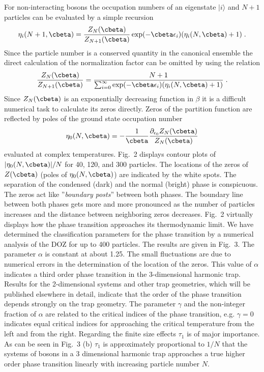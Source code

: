 For non-interacting bosons the occupation numbers
of an eigenstate $|i\rangle$  and $N+1$ particles
can be evaluated by a simple recursion \cite{bose1}
\begin{equation} \label{recocc}
\eta_i(N+1,\cbeta) = \frac{Z_N(\cbeta)}{Z_{N+1}(\cbeta)} 
\exp(-\cbeta \epsilon_i) (\eta_i(N,\cbeta)+1) \; .
\end{equation}
Since the particle number is a conserved quantity in the canonical
ensemble the direct calculation of the normalization factor 
can be omitted by using the relation
\begin{equation} \label{norm}
\frac{Z_N(\cbeta)}{Z_{N+1}(\cbeta)} = 
\frac{N+1}{\sum_{i=0}^{\infty} \exp(-\cbeta \epsilon_i)
(\eta_i(N,\cbeta)+1)} \;.
\end{equation}
Since $Z_N(\cbeta)$ is an exponentially decreasing function in
$\beta$ it is a difficult numerical task to calculate its zeros 
directly. 
Zeros of the partition function are reflected by poles of the ground
state occupation number
\begin{equation}
\eta_0(N,\cbeta)=-\frac{1}{\cbeta}
\frac{\partial_{\epsilon_0} Z_N(\cbeta)}{Z_N(\cbeta)}
\end{equation}
evaluated at complex temperatures. Fig.~2 displays contour plots of
$|\eta_0(N,\cbeta)|/N$ for 40, 120, and 300 particles.   The locations
of the zeros of $Z(\cbeta)$ (poles of $\eta_0(N,\cbeta)$) are indicated
by the white spots.   The separation of the condensed (dark) and the
normal (bright) phase is conspicuous. The zeros act like ''{\sl boundary
posts}'' between both phases. The boundary line between both phases gets
more and more pronounced as the number of particles increases and the
distance between neighboring zeros decreases. Fig.~2 virtually displays
how the phase transition approaches its thermodynamic limit. We have
determined the classification parameters for the phase transition by a
numerical analysis of the DOZ for up to 400 particles. The results are
given in Fig.~3. The parameter $\alpha$ is constant at about 1.25. The
small fluctuations are due to numerical errors in the determination of
the location of the zeros. This value of $\alpha$ indicates a third
order phase transition in the 3-dimensional harmonic trap. Results for
the 2-dimensional systems and other trap geometries, which will be
published elsewhere in detail,  indicate that the order of the phase
transition depends strongly on the trap geometry. The parameter $\gamma$
and the non-integer fraction of $\alpha$ are related to the critical
indices of the phase transition, e.g. $\gamma =0$ indicates equal
critical indices for approaching the critical temperature from the left
and from the right. Regarding the finite size effects $\tau_1$ is of
major importance. As can be seen in Fig.~3 (b) $\tau_1$ is approximately
proportional to $1/N$ that the systems of bosons in a 3 dimensional
harmonic trap approaches a true higher order phase transition linearly
with increasing particle number $N$.

